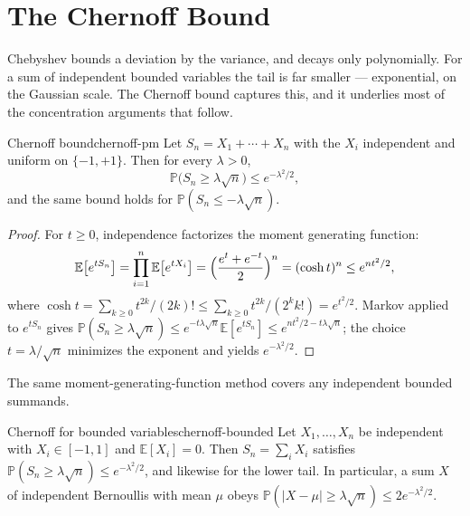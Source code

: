 \providecommand{\E}{\mathbb{E}}
\providecommand{\Prob}{\mathbb{P}}
\providecommand{\Var}{\operatorname{Var}}
\providecommand{\whp}{\textit{whp}}

\chapter{The Chernoff Bound}
\label{chap:chernoff}

Chebyshev bounds a deviation by the variance, and decays only polynomially. For
a sum of independent bounded variables the tail is far smaller --- exponential,
on the Gaussian scale. The Chernoff bound captures this, and it underlies most
of the concentration arguments that follow.

\begin{theorem}{Chernoff bound}{chernoff-pm}
Let $S_n=X_1+\cdots+X_n$ with the $X_i$ independent and uniform on $\{-1,+1\}$.
Then for every $\lambda>0$,
\[
  \Prob\bigl(S_n\ge\lambda\sqrt n\bigr)\le e^{-\lambda^2/2},
\]
and the same bound holds for $\Prob(S_n\le-\lambda\sqrt n)$.
\end{theorem}

\begin{proof}
For $t\ge0$, independence factorizes the moment generating function:
\[
  \E\bigl[e^{tS_n}\bigr]=\prod_{i=1}^n\E\bigl[e^{tX_i}\bigr]
  =\Bigl(\frac{e^{t}+e^{-t}}2\Bigr)^n=(\cosh t)^n\le e^{nt^2/2},
\]
where $\cosh t=\sum_{k\ge0}t^{2k}/(2k)!\le\sum_{k\ge0}t^{2k}/(2^k k!)=e^{t^2/2}$.
Markov applied to $e^{tS_n}$ gives
$\Prob(S_n\ge\lambda\sqrt n)\le e^{-t\lambda\sqrt n}\E[e^{tS_n}]\le
e^{nt^2/2-t\lambda\sqrt n}$; the choice $t=\lambda/\sqrt n$ minimizes the exponent
and yields $e^{-\lambda^2/2}$.
\end{proof}

The same moment-generating-function method covers any independent bounded
summands.

\begin{theorem}{Chernoff for bounded variables}{chernoff-bounded}
Let $X_1,\dots,X_n$ be independent with $X_i\in[-1,1]$ and $\E[X_i]=0$. Then
$S_n=\sum_i X_i$ satisfies $\Prob(S_n\ge\lambda\sqrt n)\le e^{-\lambda^2/2}$, and
likewise for the lower tail. In particular, a sum $X$ of independent Bernoullis
with mean $\mu$ obeys $\Prob(|X-\mu|\ge\lambda\sqrt n)\le 2e^{-\lambda^2/2}$.
\end{theorem}

